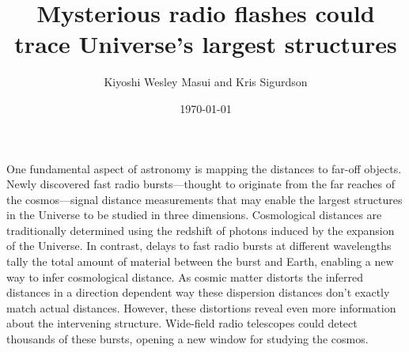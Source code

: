 \documentclass{article}
\title{Mysterious radio flashes could trace Universe's largest structures}
\date{\today}
\author{Kiyoshi Wesley Masui and Kris Sigurdson}
\begin{document}
\maketitle

One fundamental aspect of astronomy is mapping the distances to far-off objects.  Newly discovered fast radio bursts---thought to originate from the far reaches of the cosmos---signal distance measurements that may enable the largest structures in the Universe to be studied in three dimensions.  Cosmological distances are traditionally determined using the redshift of photons induced by the expansion of the Universe.    In contrast, delays to fast radio bursts at different wavelengths tally the total amount of material between the burst and Earth, enabling a new  way to infer cosmological distance.  As cosmic matter distorts the inferred distances in a direction dependent way these dispersion distances don't exactly match actual distances. However, these distortions reveal even more information about the intervening structure.  Wide-field radio telescopes could detect thousands of these bursts, opening a new window for studying the cosmos.
\end{document}
